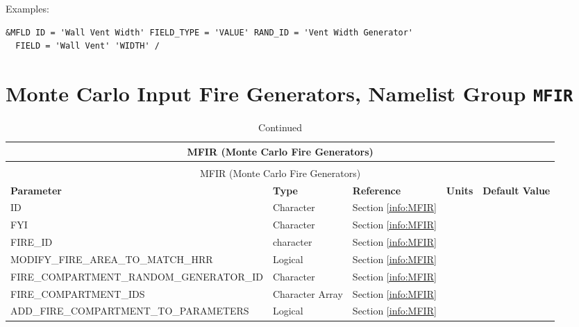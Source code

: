 \noindent Examples:
\begin{lstlisting}
&MFLD ID = 'Wall Vent Width' FIELD_TYPE = 'VALUE' RAND_ID = 'Vent Width Generator'
  FIELD = 'Wall Vent' 'WIDTH' /
\end{lstlisting}


\clearpage

\section{Monte Carlo Input Fire Generators, Namelist Group \texorpdfstring{{\tt MFIR}}{MFIR}}

\begin{landscape}
\noindent
\renewcommand{\tabcolsep}{.1in}
\begin{longtable}{|l|l|l|l|l|}
\caption[Monte Carlo Fire Generators ({\ct MFIR} namelist group)]{For more information see Section~\ref{info:MFIR}.}
\label{tbl:MFIR} \\
\hline
\multicolumn{5}{|c|}{{\ct MFIR} (Monte Carlo Fire Generators)} \\
\hline \hline
\endfirsthead
\caption[]{Continued} \\
\hline
\multicolumn{5}{|c|}{{\ct MFIR} (Monte Carlo Fire Generators)} \\
\hline \hline
\endhead
\parbox{1.5in}{\bf Parameter}    & \parbox{1in}{\bf Type}  & \parbox{1in}{\bf Reference}  & \parbox{1in}{\bf Units}  & \parbox{1in}{\bf Default Value} \\ \hline
{\ct ID}                                                    & Character         & Section \ref{info:MFIR}   &      &     \\ \hline
{\ct FYI}                                                   & Character         & Section \ref{info:MFIR}   &      &     \\ \hline
{\ct FIRE\_ID}                                              & character         & Section \ref{info:MFIR}   &      &     \\ \hline
{\ct MODIFY\_FIRE\_AREA\_TO\_MATCH\_HRR}                    & Logical           & Section \ref{info:MFIR}   &      &     \\ \hline
{\ct FIRE\_COMPARTMENT\_RANDOM\_GENERATOR\_ID}              & Character         & Section \ref{info:MFIR}   &      &     \\ \hline
{\ct FIRE\_COMPARTMENT\_IDS}                                & Character Array   & Section \ref{info:MFIR}   &      &     \\ \hline
{\ct ADD\_FIRE\_COMPARTMENT\_TO\_PARAMETERS}                & Logical           & Section \ref{info:MFIR}   &      &     \\ \hline

\end{longtable}
\end{landscape}
